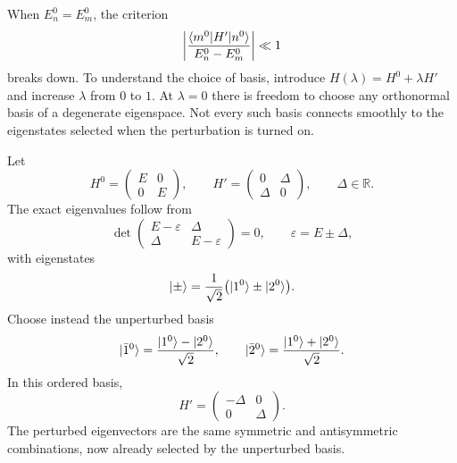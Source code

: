 When $E_n^0=E_m^0$, the criterion
\[
 \left\lvert\frac{\langle m^0\rvert H'\lvert n^0\rangle}{E_n^0-E_m^0}\right\rvert\ll1
\]
breaks down. To understand the choice of basis, introduce
$H(\lambda)=H^0+\lambda H'$ and increase $\lambda$ from $0$ to $1$.
At $\lambda=0$ there is freedom to choose any orthonormal basis of a
degenerate eigenspace. Not every such basis connects smoothly to the
eigenstates selected when the perturbation is turned on.

\begin{center}
\end{center}
Let
\[
 H^0=\begin{pmatrix}E&0\\0&E\end{pmatrix},\qquad
 H'=\begin{pmatrix}0&\Delta\\\Delta&0\end{pmatrix},\qquad\Delta\in\mathbb R.
\]
The exact eigenvalues follow from
\[
 \det\begin{pmatrix}E-\varepsilon&\Delta\\\Delta&E-\varepsilon\end{pmatrix}=0,
 \qquad\varepsilon=E\pm\Delta,
\]
with eigenstates
\[
 \lvert \pm\rangle=\frac1{\sqrt2}\bigl(\lvert 1^0\rangle\pm\lvert 2^0\rangle\bigr).
\]
Choose instead the unperturbed basis
\[
 \lvert \bar1^0\rangle=\frac{\lvert 1^0\rangle-\lvert 2^0\rangle}{\sqrt2},\qquad
 \lvert \bar2^0\rangle=\frac{\lvert 1^0\rangle+\lvert 2^0\rangle}{\sqrt2}.
\]
In this ordered basis,
\[
 H'=\begin{pmatrix}-\Delta&0\\0&\Delta\end{pmatrix}.
\]
The perturbed eigenvectors are the same symmetric and antisymmetric
combinations, now already selected by the unperturbed basis.
